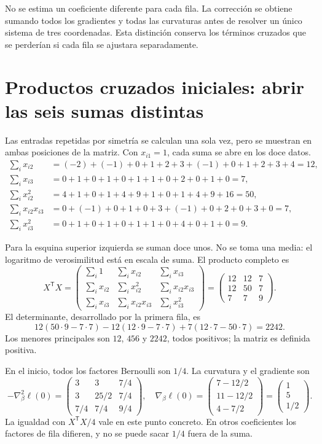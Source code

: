 \documentclass[11pt,a4paper]{article}
\newcommand{\T}{^{\mathsf T}}
\begin{document}
No se estima un coeficiente diferente para cada fila.
La corrección se obtiene sumando todos los gradientes y todas
las curvaturas antes de resolver un único sistema de tres coordenadas.
Esta distinción conserva los términos cruzados que se perderían
si cada fila se ajustara separadamente.

\clearpage
\section{Productos cruzados iniciales: abrir las seis sumas distintas}\label{logit95}
Las entradas repetidas por simetría se calculan una sola vez,
pero se muestran en ambas posiciones de la matriz.
Con \(x_{i1}=1\), cada suma se abre en los doce datos.
\[
\begin{aligned}
\sum_i x_{i2}
&=(-2)+(-1)+0+1+2+3+(-1)+0+1+2+3+4=12,\\
\sum_i x_{i3}
&=0+1+0+1+0+1+1+0+2+0+1+0=7,\\
\sum_i x_{i2}^2
&=4+1+0+1+4+9+1+0+1+4+9+16=50,\\
\sum_i x_{i2}x_{i3}
&=0+(-1)+0+1+0+3+(-1)+0+2+0+3+0=7,\\
\sum_i x_{i3}^2
&=0+1+0+1+0+1+1+0+4+0+1+0=9.
\end{aligned}
\]

Para la esquina superior izquierda se suman doce unos.
No se toma una media: el logaritmo de verosimilitud está
en escala de suma. El producto completo es
\[
X\T X=
\begin{pmatrix}
\sum_i1&\sum_i x_{i2}&\sum_i x_{i3}\\
\sum_i x_{i2}&\sum_i x_{i2}^2&\sum_i x_{i2}x_{i3}\\
\sum_i x_{i3}&\sum_i x_{i2}x_{i3}&\sum_i x_{i3}^2
\end{pmatrix}
=\begin{pmatrix}12&12&7\\12&50&7\\7&7&9\end{pmatrix}.
\]
El determinante, desarrollado por la primera fila, es
\[
12(50\cdot9-7\cdot7)
-12(12\cdot9-7\cdot7)
+7(12\cdot7-50\cdot7)=2242.
\]
Los menores principales son \(12\), \(456\) y \(2242\),
todos positivos; la matriz es definida positiva.

En el inicio, todos los factores Bernoulli son \(1/4\).
La curvatura y el gradiente son
\[
-\nabla_\beta^2\ell(0)=
\begin{pmatrix}3&3&7/4\\3&25/2&7/4\\7/4&7/4&9/4\end{pmatrix},
\quad
\nabla_\beta\ell(0)=
\begin{pmatrix}7-12/2\\11-12/2\\4-7/2\end{pmatrix}
=\begin{pmatrix}1\\5\\1/2\end{pmatrix}.
\]
La igualdad con \(X\T X/4\) vale en este punto concreto.
En otros coeficientes los factores de fila difieren,
y no se puede sacar \(1/4\) fuera de la suma.
\end{document}
